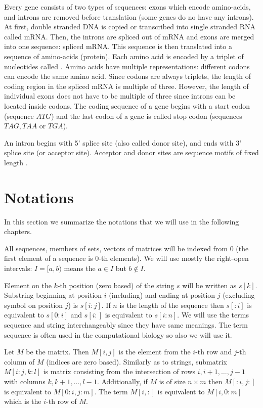 Every gene consists of two types of
sequences: exons which encode amino-acids, and introns are removed
before translation (some genes do no have any introns). At first,
double stranded DNA is copied or transcribed into single stranded RNA called
mRNA. Then, the introns are spliced out of mRNA and exons are merged into one
sequence: spliced mRNA. This sequence is then translated into a sequence of
amino-acids (protein). Each amino acid is encoded by a triplet of nucleotides
called . Amino acids have multiple representations: different
codons can encode the same amino acid. Since codons are always triplets, the length
of coding region in the  spliced mRNA is multiple of three. However, the length
of individual exons does not
have to be multiple of three since introns can be located inside codons.  The
coding sequence of a gene begins with a start codon (sequence $ATG$) and the
last codon of a gene is called stop codon (sequences $TAG,TAA$ or $TGA$).

An intron begins with 5' splice site (also called donor site),  and ends with
3' splice site (or acceptor site).  Acceptor and donor sites are sequence motifs
of fixed length \cite{Pairagon2009,UnderstandingBioinformatics}.


\section{Notations}

In this section we summarize the notations that we will use in the following
chapters.

All sequences, members of sets, vectors of matrices will be indexed from $0$
(the first element of a sequence is $0$-th elements). We will use mostly
the right-open intervals: $I=[a,b)$ means the $a\in I$ but $b\notin I$. 

Element on the $k$-th position (zero based) of the string $s$
will be written as $s[k]$. Substring beginning at position $i$ (including) and
ending at position $j$ (excluding symbol on position $j$) is $s[i:j]$.  If $n$
is the length of the sequence then $s[:i]$ is equivalent to $s[0:i]$ and $s[i:]$
is equivalent to $s[i:n]$.  We will use the terms sequence and string
interchangeably since they have same meanings. The term sequence is often used
in the computational biology so also we will use it.

Let $M$ be the matrix. Then $M[i,j]$ is the element from the $i$-th row and
$j$-th column of $M$ (indices are zero based). Similarly as to strings,
submatrix $M[i:j,k:l]$ is matrix consisting from the intersection of rows
$i,i+1,\dots, j-1$ with columns $k,k+1,\dots,l-1$. Additionally, if $M$ is of
size $n\times m$ then $M[:i,j:]$ is equivalent to $M[0:i,j:m]$.  The term
$M[i,:]$ is equivalent to $M[i,0:m]$ which is the $i$-th row of $M$.
